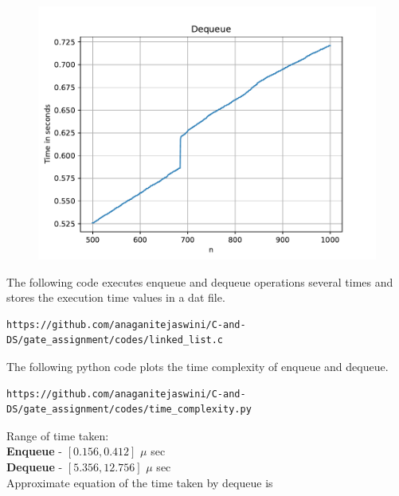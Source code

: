 \documentclass[journal,12pt,twocolumn]{IEEEtran}
\begin{document}
\begin{figure}[!ht]
    \begin{center}
    \includegraphics[width=\columnwidth]{./figs/dequeue}
    \end{center}
    \label{fig3}	
\end{figure}

The following code executes enqueue and dequeue operations several times and stores the execution time values in a dat file.

\begin{lstlisting}
https://github.com/anaganitejaswini/C-and-DS/gate_assignment/codes/linked_list.c
\end{lstlisting}
The following python code plots the time complexity of enqueue and dequeue.
\begin{lstlisting}
https://github.com/anaganitejaswini/C-and-DS/gate_assignment/codes/time_complexity.py
\end{lstlisting}

Range of time taken: 
\\
\textbf{Enqueue} -  $[0.156, 0.412]$ $\mu$ sec
\\
\textbf{Dequeue} - $[5.356, 12.756]$ $\mu$ sec
\\
Approximate equation of the time taken by dequeue is
\end{document}
